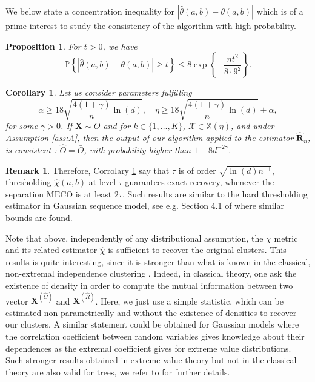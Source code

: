 \documentclass[11pt]{article}
\newcommand{\MECO}{\mathrm{MECO}}
\newtheorem{proposition}{Proposition}
\newtheorem{corollary}{Corollary}
\theoremstyle{definition}
\newtheorem{remark}{Remark}
\begin{document}
	We below state a concentration inequality for $|\hat{\theta}(a,b) - \theta(a,b)|$ which is of a prime interest to study the consistency of the algorithm with high probability.
	
	\begin{proposition}
	\label{prop:concentration_inequality}
		For $t >0$, we have
		\begin{equation*}
			\mathbb{P}\left\{ |\hat{\theta}(a,b) - \theta(a,b) | \geq t \right\} \leq 8 \exp\left\{ - \frac{n t^2}{8 \cdot 9^2}\right\}.
		\end{equation*}
	\end{proposition}
	
	\begin{corollary}
		\label{corr:exact_recovery}
		Let us consider parameters fulfilling 
		\begin{equation*}
		\alpha \geq 18 \sqrt{\frac{4(1+\gamma)}{n} \ln(d)}, \quad \eta \geq  18 \sqrt{\frac{4(1+\gamma)}{n} \ln(d)} + \alpha,
		\end{equation*}
		for some $\gamma > 0$. If $\textbf{X} \sim O$ and for $k \in \{1,\dots, K\}$, $\mathcal{X} \in \mathbb{X}(\eta)$, and under Assumption \ref{ass:A}, then the output of our algorithm applied to the estimator $\hat{\textbf{R}}_n$, is consistent : $\hat{O} = \bar{O}$, with probability higher than $1-8d^{-2\gamma}$.
	\end{corollary}
	
	\begin{remark}
		Therefore, Corrolary \ref{corr:exact_recovery} say that $\tau$ is of order $\sqrt{\ln(d) n^{-1}}$, thresholding $\hat{\chi}(a,b)$ at level $\tau$ guarantees exact recovery, whenever the separation $\MECO$ is at least $2 \tau$. Such results are similar to the hard thresholding estimator in Gaussian sequence model, see e.g. Section 4.1 of \cite{tsybakov2014aggregation} where similar bounds are found.
	\end{remark}
	Note that above, independently of any distributional assumption, the $\chi$ metric and its related estimator $\hat{\chi}$ is sufficient to recover the original clusters. This results is quite interesting, since it is stronger than what is known in the classical, non-extremal independence clustering \cite{NIPS2017_37d097ca}. Indeed, in classical theory, one ask the existence of density in order to compute the mutual information between two vector $\textbf{X}^{(\hat{C})}$ and $\textbf{X}^{(\hat{R})}$. Here, we just use a simple statistic, which can be estimated non parametrically and without the existence of densities to recover our clusters. A similar statement could be obtained for Gaussian models where the correlation coefficient between random variables gives knowledge about their dependences as the extremal coefficient gives for extreme value distributions. Such stronger results obtained in extreme value theory but not in the classical theory are also valid for trees, we refer to \cite{engelke2020structure} for further details.
	
\end{document}
